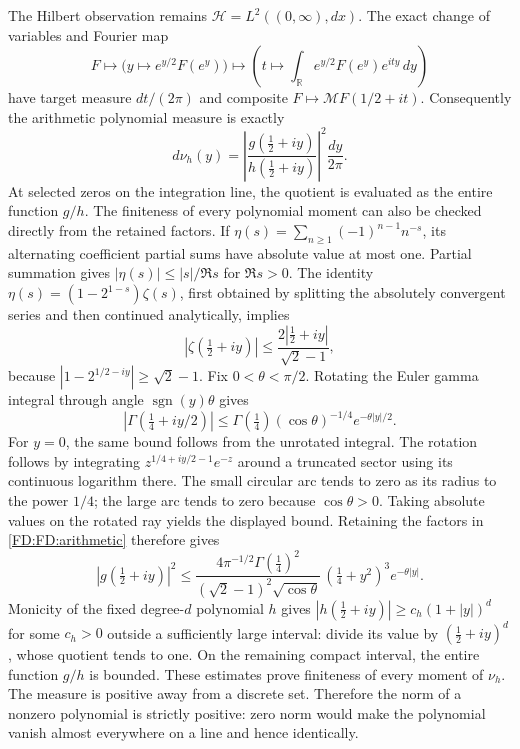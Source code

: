 The Hilbert observation remains
\(\mathcal H=L^2((0,\infty),dx)\).  The exact change of variables and
Fourier map
\[
F\longmapsto \bigl(y\longmapsto e^{y/2}F(e^y)\bigr)
\longmapsto\left(t\longmapsto\int_{\mathbb R}e^{y/2}F(e^y)e^{ity}\,dy\right)
\]
have target measure \(dt/(2\pi)\) and composite
\(F\mapsto\mathcal MF(1/2+it)\).  Consequently the arithmetic polynomial
measure is exactly
\begin{equation}
d\nu_h(y)=\left|\frac{g(\tfrac12+iy)}{h(\tfrac12+iy)}\right|^2
\frac{dy}{2\pi}.
\tag{FD.5}\label{FD:FD:measure}
\end{equation}
At selected zeros on the integration line, the quotient is evaluated as
the entire function \(g/h\).  The finiteness of every polynomial moment
can also be checked directly from the retained factors.  If
\(\eta(s)=\sum_{n\ge1}(-1)^{n-1}n^{-s}\), its alternating coefficient
partial sums have absolute value at most one.  Partial summation gives
\(\lvert\eta(s)\rvert\le\lvert s\rvert/\Re s\) for \(\Re s>0\).
The identity
\(\eta(s)=(1-2^{1-s})\zeta(s)\), first obtained by splitting the
absolutely convergent series and then continued analytically, implies
\[
|\zeta(\tfrac12+iy)|
\le\frac{2|\tfrac12+iy|}{\sqrt2-1},
\]
because \(|1-2^{1/2-iy}|\ge\sqrt2-1\).
Fix \(0<\theta<\pi/2\).  Rotating the Euler gamma integral through
angle \(\operatorname{sgn}(y)\theta\) gives
\[
|\Gamma(\tfrac14+iy/2)|
\le\Gamma(\tfrac14)(\cos\theta)^{-1/4}e^{-\theta|y|/2}.
\]
For \(y=0\), the same bound follows from the unrotated integral.
The rotation follows by integrating
\(z^{1/4+iy/2-1}e^{-z}\) around a truncated sector using its continuous
logarithm there.  The small circular arc tends to zero as its radius
to the power \(1/4\); the large arc tends to zero because
\(\cos\theta>0\).  Taking absolute values on the rotated ray yields
the displayed bound.  Retaining the factors in \eqref{FD:FD:arithmetic}
therefore gives
\[
|g(\tfrac12+iy)|^2
\le
\frac{4\pi^{-1/2}\Gamma(\tfrac14)^2}
{(\sqrt2-1)^2\sqrt{\cos\theta}}\,
(\tfrac14+y^2)^3e^{-\theta|y|}.
\]
Monicity of the fixed degree-\(d\) polynomial \(h\) gives
\(|h(\tfrac12+iy)|\ge c_h(1+|y|)^d\) for some \(c_h>0\) outside
a sufficiently large interval: divide its value by
\((\tfrac12+iy)^d\), whose quotient tends to one.  On the remaining
compact interval, the entire function \(g/h\) is bounded.
These estimates prove finiteness of every moment of \(\nu_h\).
The measure is positive away from a discrete set.
Therefore the norm of a nonzero polynomial is
strictly positive: zero norm would make the polynomial vanish almost
everywhere on a line and hence identically.

